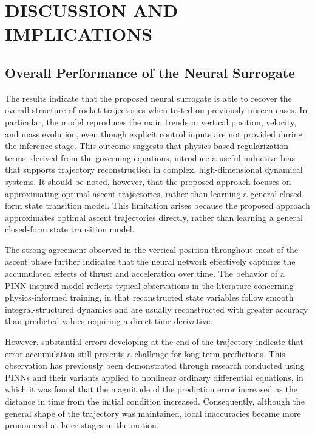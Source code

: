 \chapter{DISCUSSION AND IMPLICATIONS}


\section{Overall Performance of the Neural Surrogate}

The results indicate that the proposed neural surrogate is able to recover the 
overall structure of rocket trajectories when tested on previously unseen cases. In particular, 
the model reproduces the main trends in vertical position, velocity, and mass evolution, even 
though explicit control inputs are not provided during the inference stage. This outcome suggests 
that physics-based regularization terms, derived from the governing equations, introduce a useful 
inductive bias that supports trajectory reconstruction in complex, high-dimensional dynamical systems. 
It should be noted, however, that the proposed approach focuses on approximating optimal ascent 
trajectories, rather than learning a general closed-form state transition model. This limitation 
arises because the proposed approach approximates optimal ascent trajectories directly, rather 
than learning a general closed-form state transition model.

The strong agreement observed in the vertical position throughout most of the ascent phase further 
indicates that the neural network effectively captures the accumulated effects of thrust and acceleration 
over time. The behavior of a PINN-inspired model reflects typical observations in the literature concerning 
physics-informed training, in that reconstructed state variables follow smooth integral-structured dynamics 
and are usually reconstructed with greater accuracy than predicted values requiring a direct time derivative.

However, substantial errors developing at the end of the trajectory indicate that error accumulation still 
presents a challenge for long-term predictions. This observation has previously been demonstrated through 
research conducted using PINNs and their variants applied to nonlinear ordinary differential equations, in 
which it was found that the magnitude of the prediction error increased as the distance in time from the initial 
condition increased. Consequently, although the general shape of the trajectory was maintained, local inaccuracies 
became more pronounced at later stages in the motion.

